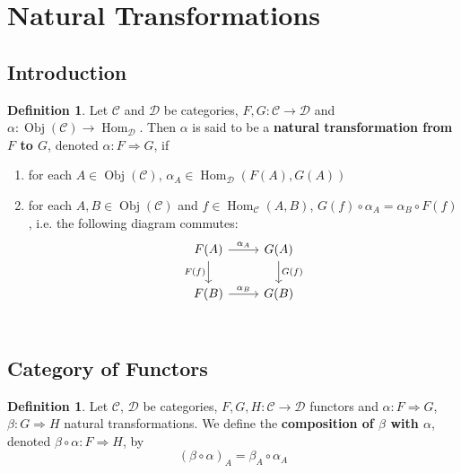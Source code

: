 \documentclass{book}
\theoremstyle{definition}
\newtheorem{defn}[definition]{Definition}
\newcommand{\al}{\alpha}
\newcommand{\be}{\beta}
\newcommand{\MC}{\mathcal{C}}
\newcommand{\MD}{\mathcal{D}}
\newcommand{\ld}[1]{\label{defn:#1}}
\DeclareMathOperator{\Obj}{Obj}
\DeclareMathOperator{\Hom}{Hom}
\DeclareMathOperator*{\0}{\mbf{0}}
\DeclareMathOperator*{\1}{\mbf{1}}
\begin{document}
	
	
	
	
	
	
	
	
	
	
	
	
	\newpage
	\section{Natural Transformations}
	
	\subsection{Introduction}
	
	\begin{defn} \ld{14001}
		Let $\MC$ and $\MD$ be categories, $F, G: \MC \rightarrow \MD$ and $ \al : \Obj(\MC) \rightarrow  \Hom_{\MD}$. Then $\al$ is said to be a \textbf{natural transformation from $F$ to $G$}, denoted $\al: F \Rightarrow G$, if
		\begin{enumerate}
			\item for each $A \in \Obj(\MC)$, $\al_A \in \Hom_{\MD}(F(A), G(A))$
			\item for each $A, B \in \Obj(\MC)$ and $f \in \Hom_{\MC}(A,B)$, $G(f) \circ \al_A = \al_B \circ F(f)$, i.e. the following diagram commutes: 
			\[ 
			\begin{tikzcd}
				F(A)  \arrow[r, "\al_A"]  \arrow[d, "F(f)"']  & G(A)   \arrow[d, "G(f)"]\\
				F(B) \arrow[r, "\al_B"] &  G(B) \\
			\end{tikzcd}
			\]
		\end{enumerate}
	\end{defn}






	
	
	
	
	
	
	
	
	
	
	\subsection{Category of Functors}
	\begin{defn} \ld{14002}
		Let $\MC$, $\MD$ be categories, $F, G, H:\MC \rightarrow \MD$ functors and $\al: F \Rightarrow G$, $\be : G \Rightarrow H$ natural transformations. We define the \textbf{composition of $\be$ with $\al$}, denoted $\be \circ \al: F \Rightarrow H$, by 
		$$(\be \circ \al)_{A} = \be_A \circ \al_A$$ 
	\end{defn}
	
\end{document}
